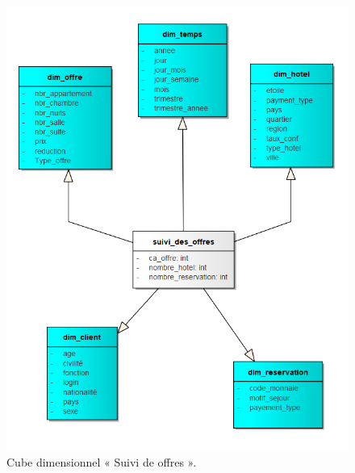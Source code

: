\begin{figure}[!htbp]
	\begin{center}
		\includegraphics[scale=0.85]{images/cube_offre.png}
		\caption{Cube dimensionnel « Suivi de offres ».}
		\label{use_bi_tools}
	\end{center}
\end{figure}

